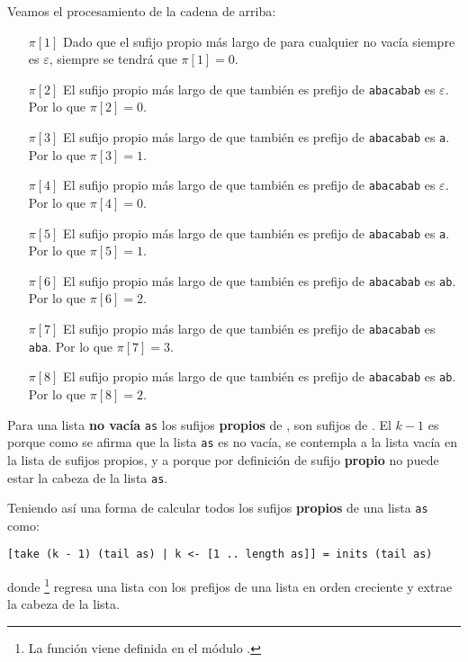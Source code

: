 Veamos el procesamiento de la cadena de arriba:
\begin{itemize}
\item[$\pi{[1]}$] Dado que el sufijo propio más largo de  para
cualquier no vacía siempre es $\varepsilon$, siempre se tendrá que $\pi[1] = 0$.
\item[$\pi{[2]}$] El sufijo propio más largo de  que también es
prefijo de \texttt{abacabab} es $\varepsilon$. Por lo que $\pi[2] = 0$.
\item[$\pi{[3]}$] El sufijo propio más largo de  que también es
prefijo de \texttt{abacabab} es \texttt{a}. Por lo que $\pi[3] = 1$.
\item[$\pi{[4]}$] El sufijo propio más largo de  que también es
prefijo de \texttt{abacabab} es $\varepsilon$. Por lo que $\pi[4] = 0$.
\item[$\pi{[5]}$] El sufijo propio más largo de  que también
es prefijo de \texttt{abacabab} es \texttt{a}. Por lo que $\pi[5] = 1$.
\item[$\pi{[6]}$] El sufijo propio más largo de  que también
es prefijo de \texttt{abacabab} es \texttt{ab}. Por lo que $\pi[6] = 2$.
\item[$\pi{[7]}$] El sufijo propio más largo de  que también
es prefijo de \texttt{abacabab} es \texttt{aba}. Por lo que $\pi[7] = 3$.
\item[$\pi{[8]}$] El sufijo propio más largo de  que también
es prefijo de \texttt{abacabab} es \texttt{ab}. Por lo que $\pi[8] = 2$.
\end{itemize}

Para una lista \textbf{no vacía} \texttt{as} los sufijos \textbf{propios} de ,
son sufijos de . El $k-1$ es porque como se afirma que la lista
\texttt{as} es no vacía, se contempla a la lista vacía en la lista de sufijos propios, y a
 porque por definición de sufijo \textbf{propio} no puede estar la cabeza de
la lista \texttt{as}.

Teniendo así una forma de calcular todos los sufijos \textbf{propios} de una lista \texttt{as} como:
\begin{verbatim}
[take (k - 1) (tail as) | k <- [1 .. length as]] = inits (tail as)
\end{verbatim}
donde \footnote{
    La función  viene definida en el módulo .
} regresa una lista con los prefijos de una lista en orden creciente y  extrae la
cabeza de la lista.

